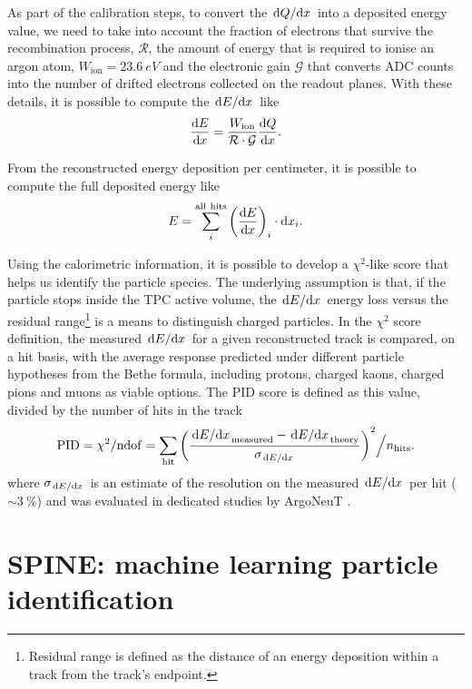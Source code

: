 As part of the calibration steps, to convert the $\dv*{Q}{x}$ into a deposited energy value, we need to take into account the fraction of electrons that survive the recombination process, $\mathcal{R}$, the amount of energy that is required to ionise an argon atom, $W_\mathrm{ion} = \SI{23.6}{eV}$ \cite{navasReviewParticlePhysics2024} and the electronic gain $\mathcal{G}$ that converts ADC counts into the number of drifted electrons collected on the readout planes. With these details, it is possible to compute the $\dv*{E}{x}$ like \begin{equation}
    \dv{E}{x} = \frac{W_\mathrm{ion}}{\mathcal{R\cdot G}} \dv{Q}{x}. 
\end{equation}

From the reconstructed energy deposition per centimeter, it is possible to compute the full deposited energy like \begin{equation}
    E = \sum_i^\mathrm{all\ hits} \qty(\dv{E}{x} )_i \cdot \dd x_i. 
\end{equation}

Using the calorimetric information, it is possible to develop a $\chi^2$-like score that helps us identify the particle species. The underlying assumption is that, if the particle stops inside the TPC active volume, the $\dv*{E}{x}$ energy loss versus the residual range\footnote{Residual range is defined as the distance of an energy deposition within a track from the track's endpoint.} is a means to distinguish charged particles. In the $\chi^2$ score definition, the measured $\dv*{E}{x}$ for a given reconstructed track is compared, on a hit basis, with the average response predicted under different particle hypotheses from the Bethe formula, including protons, charged kaons, charged pions and muons as viable options. The PID score is defined as this value, divided by the number of hits in the track \cite{arteroponsStudyReconstructionNuMuCC} \begin{equation}
    \mathrm{PID} = \chi^2/\mathrm{ndof} = \sum_\mathrm{hit} \qty(\frac{{\dv*{E}{x}}_\mathrm{measured} - {\dv*{E}{x}}_\mathrm{theory}}{\sigma_{\dv*{E}{x}}})^2 \Big/ n_\mathrm{hits}. \label{eq:PID}
\end{equation} where $\sigma_{\dv*{E}{x}}$ is an estimate of the resolution on the measured $\dv*{E}{x}$ per hit (${\sim}\SI{3}{\percent}$) and was evaluated in dedicated studies by ArgoNeuT \cite{ArgoNeuT:2013kpa}.

\section{SPINE: machine learning particle identification} \label{sec:SPINE}

